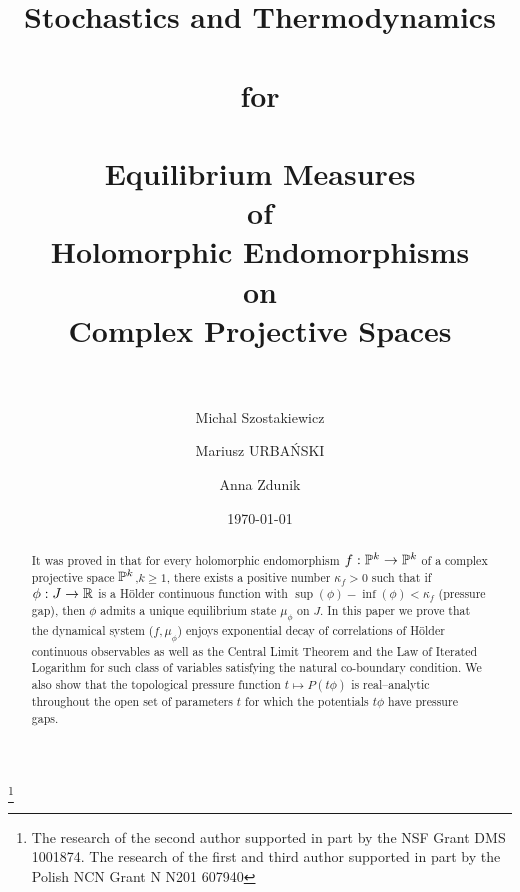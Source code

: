 \documentclass[12pt]{amsart}
\numberwithin{equation}{section}
\def\ka{\kappa}
\begin{document}

\title[]
{ \bf\large {\Large S}tochastics and Thermodynamics \\ \ \\ for \\ \ \\
  Equilibrium Measures \\ of \\ Holomorphic 
  Endomorphisms \\ on \\ Complex Projective Spaces \\ \ \ }
\date{\today}

\author[\sc Michal SZOSTAKIEWICZ]{\sc Michal Szostakiewicz}
\address{Michal Szostakiewicz, Institute of Mathematics, Warsaw University,
ul. Banacha 2, 02-097 Warszawa, Poland}
\author[\sc Mariusz URBA\'NSKI]{\sc Mariusz URBA\'NSKI}
\address{Mariusz Urba\'nski, Department of Mathematics,
 University of North Texas, Denton, TX 76203-1430, USA}
\author[\sc Anna ZDUNIK]{\sc Anna Zdunik}
\address{Anna Zdunik, Institute of Mathematics, Warsaw University,
ul. Banacha 2, 02-097 Warszawa, Poland}

%
\thanks{The research of the second author supported in part by the
NSF Grant DMS 1001874. The research of the first and third
author supported in 
part by the Polish NCN  Grant
N N201 607940}

\begin{abstract}
It was proved in \cite{uzpk} that for every  holomorphic endomorphism
$f:{\mathbb P}^k\to{\mathbb P}^k$ of a complex 
projective space ${\mathbb P}^k$,$k\ge 1$, there exists a positive number
$\ka_f>0$ such that if $\phi:J\to{\mathbb R}$ is a H\"older continuous
function with $\sup(\phi)-\inf(\phi)<\ka_f$ (pressure gap), then $\phi$ admits a
unique equilibrium state $\mu_\phi$ on $J$. In this paper we prove
that the dynamical system ($f,\mu_\phi$) enjoys exponential 
decay of correlations of H\"older continuous observables as well as
the Central Limit Theorem and the Law of Iterated Logarithm for such
class of variables satisfying the natural co-boundary condition. We
also show that the topological pressure
function $t\mapsto P(t\phi)$ is real--analytic throughout the open set
of parameters $t$ for which  the potentials $t\phi$ have pressure gaps.
\end{abstract}
\end{document}
